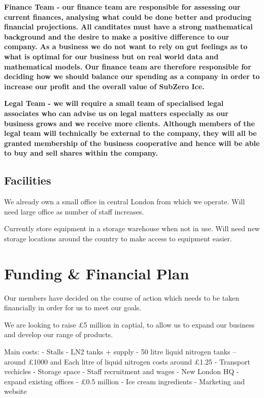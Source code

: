 \documentclass{article}
\begin{document}
 \bf{Finance Team} - our finance team are responsible for assessing our current finances, analysing what could be done better and producing financial projections. All canditates must have a strong mathematical background and the desire to make a positive difference to our company. As a business we do not want to rely on gut feelings as to what is optimal for our business but on real world data and mathematical models. Our finance team are therefore responsible for deciding how we should balance our spending as a company in order to increase our profit and the overall value of SubZero Ice.

 \bf{Legal Team} - we will require a small team of specialised legal associates who can advise us on legal matters especially as our business grows and we receive more clients. Although members of the legal team will technically be external to the company, they will all be granted membership of the business cooperative and hence will be able to buy and sell shares within the company.


  \subsection{Facilities}

  We already own a small office in central London from which we operate.
  Will need large office as number of staff increases.

  Currently store equipment in a storage warehouse when not in use.
  Will need new storage locations around the country to make access to equipment easier.


\section{Funding \& Financial Plan}

Our members have decided on the course of action which needs to be taken financially in order for us to meet our goals.

We are looking to raise £5 million in captial, to allow us to expand our business and develop our range of products.

Main costs:
 - Stalls - LN2 tanks + supply - 50 litre liquid nitrogen tanks – around £1000 and Each litre of liquid nitrogen costs around £1.25
 - Transport vechicles
 - Storage space
 - Staff recruitment and wages
 - New London HQ - expand existing offices - £0.5 million
 - Ice cream ingredients
 - Marketing and website
\end{document}
